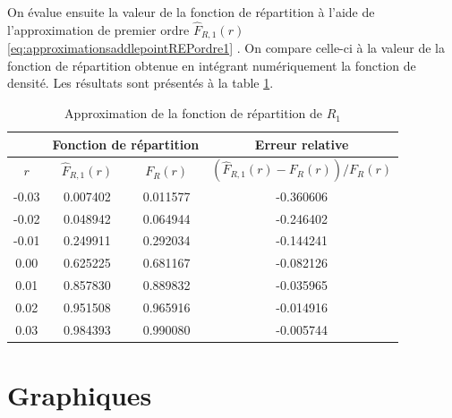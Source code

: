 On évalue ensuite la valeur de la fonction de répartition à l'aide de
l'approximation de premier ordre $\hat{F}_{R,1}(r)$
\eqref{eq:approximationsaddlepointREPordre1} %
. On compare celle-ci à la valeur de la fonction de répartition
obtenue en intégrant numériquement la fonction de densité. Les
résultats sont présentés à la table \ref{tab:approximationrepartR1}.

\begin{table}[ht]
  \centering
  \begin{tabular}{cccc}
    & \multicolumn{2}{c}{\textbf{Fonction de répartition}} & \multicolumn{1}{c}{\textbf{Erreur relative}} \\
    \hline
    $r$ & $\hat{F}_{R,1}(r)$ & ${F}_{R}(r)$ & $(\hat{F}_{R,1}(r)-{F}_{R}(r))/{{F}_{R}(r)}$ \\ 
    \hline
    -0.03 & 0.007402 & 0.011577 & -0.360606 \\ 
    -0.02 & 0.048942 & 0.064944 & -0.246402 \\ 
    -0.01 & 0.249911 & 0.292034 & -0.144241 \\ 
    0.00 & 0.625225 & 0.681167 & -0.082126 \\ 
    0.01 & 0.857830 & 0.889832 & -0.035965 \\ 
    0.02 & 0.951508 & 0.965916 & -0.014916 \\ 
    0.03 & 0.984393 & 0.990080 & -0.005744 \\
    \hline
  \end{tabular}
  \caption{Approximation de la fonction de répartition de $R_1$}
  \label{tab:approximationrepartR1}
\end{table}

\section{Graphiques}
\label{sec:graphiques}

